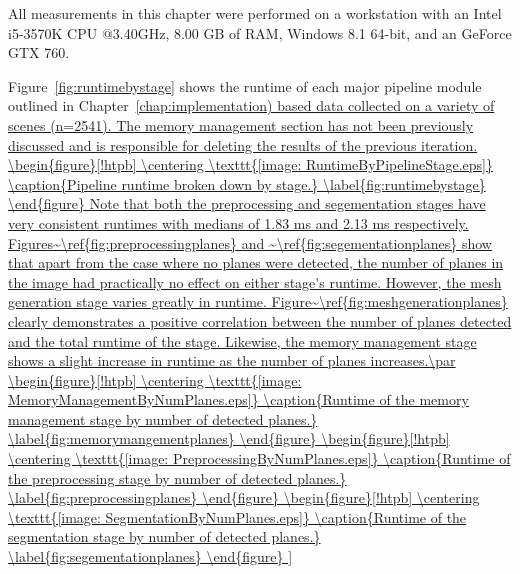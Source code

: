 All measurements in this chapter were performed on a workstation with an Intel i5-3570K CPU @3.40GHz, 8.00 GB of RAM, Windows 8.1 64-bit, and an GeForce GTX 760. \par 
Figure~\ref{fig:runtimebystage} shows the runtime of each major pipeline module outlined in Chapter~\ref{chap:implementation) based data collected on a variety of scenes (n=2541). The memory management section has not been previously discussed and is responsible for deleting the results of the previous iteration. 
\begin{figure}[!htpb]
    \centering
    \texttt{[image: RuntimeByPipelineStage.eps]}
    \caption{Pipeline runtime broken down by stage.}
    \label{fig:runtimebystage}
\end{figure}
Note that both the preprocessing and segementation stages have very consistent runtimes with medians of 1.83 ms and 2.13 ms respectively. Figures~\ref{fig:preprocessingplanes} and ~\ref{fig:segementationplanes} show that apart from the case where no planes were detected, the number of planes in the image had practically no effect on either stage's runtime. However, the mesh generation stage varies greatly in runtime. Figure~\ref{fig:meshgenerationplanes} clearly demonstrates a positive correlation between the number of planes detected  and the total runtime of the stage. Likewise, the memory management stage shows a slight increase in runtime as the number of planes increases.\par

\begin{figure}[!htpb]
    \centering
    \texttt{[image: MemoryManagementByNumPlanes.eps]}
    \caption{Runtime of the memory management stage by number of detected planes.}
    \label{fig:memorymangementplanes}
\end{figure}


\begin{figure}[!htpb]
    \centering
    \texttt{[image: PreprocessingByNumPlanes.eps]}
    \caption{Runtime of the preprocessing stage by number of detected planes.}
    \label{fig:preprocessingplanes}
\end{figure}



\begin{figure}[!htpb]
    \centering
    \texttt{[image: SegmentationByNumPlanes.eps]}
    \caption{Runtime of the segmentation stage by number of detected planes.}
    \label{fig:segementationplanes}
\end{figure}



}
